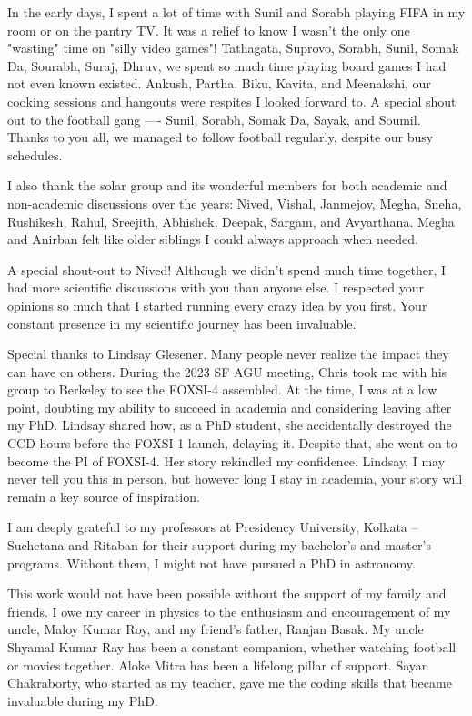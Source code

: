 \noindent
In the early days, I spent a lot of time with Sunil and Sorabh playing FIFA in my room or on the pantry TV. It was a relief to know I wasn’t the only one "wasting" time on "silly video games"! Tathagata, Suprovo, Sorabh, Sunil, Somak Da, Sourabh, Suraj, Dhruv, we spent so much time playing board games I had not even known existed. Ankush, Partha, Biku, Kavita, and Meenakshi, our cooking sessions and hangouts were respites I looked forward to. A special shout out to the football gang {—-} Sunil, Sorabh, Somak Da, Sayak, and Soumil. Thanks to you all, we managed to follow football regularly, despite our busy schedules.  

\noindent
I also thank the solar group and its wonderful members for both academic and non-academic discussions over the years: Nived, Vishal, Janmejoy, Megha, Sneha, Rushikesh, Rahul, Sreejith, Abhishek, Deepak, Sargam, and Avyarthana. Megha and Anirban felt like older siblings I could always approach when needed.  

\noindent
A special shout-out to Nived! Although we didn't spend much time together, I had more scientific discussions with you than anyone else. I respected your opinions so much that I started running every crazy idea by you first. Your constant presence in my scientific journey has been invaluable.  

\noindent
Special thanks to Lindsay Glesener. Many people never realize the impact they can have on others. During the 2023 SF AGU meeting, Chris took me with his group to Berkeley to see the FOXSI-4 assembled. At the time, I was at a low point, doubting my ability to succeed in academia and considering leaving after my PhD. Lindsay shared how, as a PhD student, she accidentally destroyed the CCD hours before the FOXSI-1 launch, delaying it. Despite that, she went on to become the PI of FOXSI-4. Her story rekindled my confidence. Lindsay, I may never tell you this in person, but however long I stay in academia, your story will remain a key source of inspiration.  

\noindent
I am deeply grateful to my professors at Presidency University, Kolkata {--} Suchetana and Ritaban for their support during my bachelor’s and master’s programs. Without them, I might not have pursued a PhD in astronomy.  

\noindent
This work would not have been possible without the support of my family and friends. I owe my career in physics to the enthusiasm and encouragement of my uncle, Maloy Kumar Roy, and my friend’s father, Ranjan Basak. My uncle Shyamal Kumar Ray has been a constant companion, whether watching football or movies together. Aloke Mitra has been a lifelong pillar of support. Sayan Chakraborty, who started as my teacher, gave me the coding skills that became invaluable during my PhD.  

